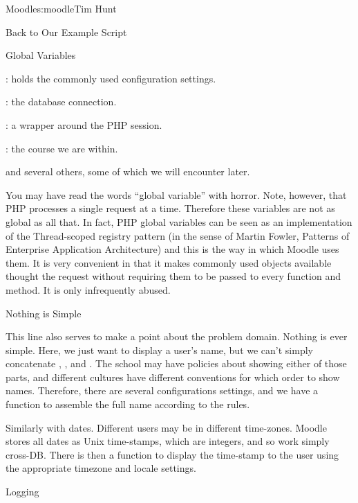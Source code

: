 \begin{aosachapter}{Moodle}{s:moodle}{Tim Hunt}
\begin{aosasect1}{Back to Our Example Script}
\begin{aosasect2}{Global Variables}
\begin{aosaitemize}
\item {}: holds the commonly used configuration settings.

\item {}: the database connection.

\item {}: a wrapper around the PHP session.

\item {}: the course we are within.

\end{aosaitemize}

\noindent
and several others, some of which we will encounter later.

You may have read the words ``global variable'' with horror. Note,
however, that PHP processes a single request at a time. Therefore
these variables are not as global as all that. In fact, PHP global
variables can be seen as an implementation of the Thread-scoped
registry pattern (in the sense of Martin Fowler, Patterns of
Enterprise Application Architecture) and this is the way in which
Moodle uses them. It is very convenient in that it makes commonly used
objects available thought the request without requiring them to be
passed to every function and method. It is only infrequently abused.

\end{aosasect2}

\begin{aosasect2}{Nothing is Simple}

This line also serves to make a point about the problem
domain. Nothing is ever simple. Here, we just want to display a user's
name, but we can't simply concatenate ,
, and . The school may have policies
about showing either of those parts, and different cultures have
different conventions for which order to show names. Therefore, there
are several configurations settings, and we have a function to
assemble the full name according to the rules.

Similarly with dates. Different users may be in different
time-zones. Moodle stores all dates as Unix time-stamps, which are
integers, and so work simply cross-DB. There is then a 
function to display the time-stamp to the user using the appropriate
timezone and locale settings.

\end{aosasect2}

\begin{aosasect2}{Logging}


\end{aosasect2}
\end{aosasect1}
\end{aosachapter}
